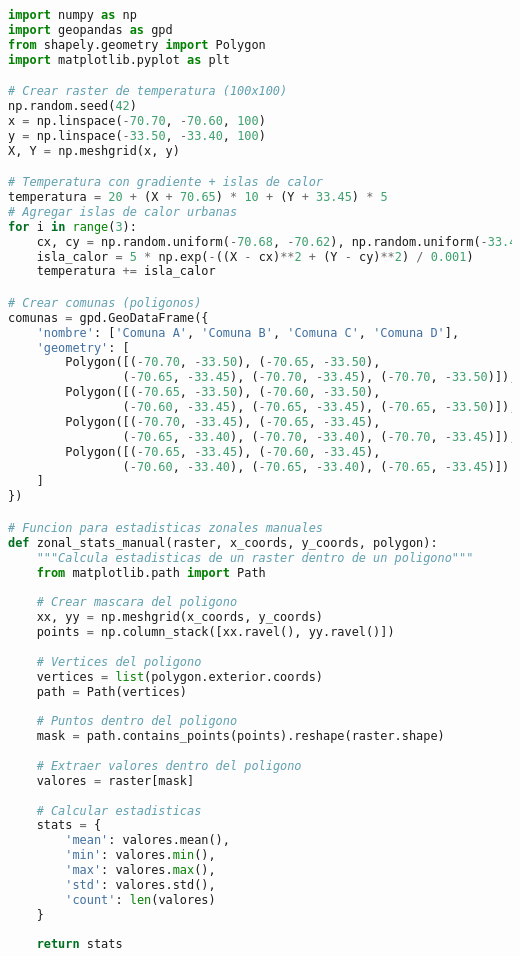 \documentclass[11pt,a4paper]{article}
\begin{document}
\begin{lstlisting}[language=Python]
import numpy as np
import geopandas as gpd
from shapely.geometry import Polygon
import matplotlib.pyplot as plt

# Crear raster de temperatura (100x100)
np.random.seed(42)
x = np.linspace(-70.70, -70.60, 100)
y = np.linspace(-33.50, -33.40, 100)
X, Y = np.meshgrid(x, y)

# Temperatura con gradiente + islas de calor
temperatura = 20 + (X + 70.65) * 10 + (Y + 33.45) * 5
# Agregar islas de calor urbanas
for i in range(3):
    cx, cy = np.random.uniform(-70.68, -70.62), np.random.uniform(-33.48, -33.42)
    isla_calor = 5 * np.exp(-((X - cx)**2 + (Y - cy)**2) / 0.001)
    temperatura += isla_calor

# Crear comunas (poligonos)
comunas = gpd.GeoDataFrame({
    'nombre': ['Comuna A', 'Comuna B', 'Comuna C', 'Comuna D'],
    'geometry': [
        Polygon([(-70.70, -33.50), (-70.65, -33.50), 
                (-70.65, -33.45), (-70.70, -33.45), (-70.70, -33.50)]),
        Polygon([(-70.65, -33.50), (-70.60, -33.50), 
                (-70.60, -33.45), (-70.65, -33.45), (-70.65, -33.50)]),
        Polygon([(-70.70, -33.45), (-70.65, -33.45), 
                (-70.65, -33.40), (-70.70, -33.40), (-70.70, -33.45)]),
        Polygon([(-70.65, -33.45), (-70.60, -33.45), 
                (-70.60, -33.40), (-70.65, -33.40), (-70.65, -33.45)])
    ]
})

# Funcion para estadisticas zonales manuales
def zonal_stats_manual(raster, x_coords, y_coords, polygon):
    """Calcula estadisticas de un raster dentro de un poligono"""
    from matplotlib.path import Path
    
    # Crear mascara del poligono
    xx, yy = np.meshgrid(x_coords, y_coords)
    points = np.column_stack([xx.ravel(), yy.ravel()])
    
    # Vertices del poligono
    vertices = list(polygon.exterior.coords)
    path = Path(vertices)
    
    # Puntos dentro del poligono
    mask = path.contains_points(points).reshape(raster.shape)
    
    # Extraer valores dentro del poligono
    valores = raster[mask]
    
    # Calcular estadisticas
    stats = {
        'mean': valores.mean(),
        'min': valores.min(),
        'max': valores.max(),
        'std': valores.std(),
        'count': len(valores)
    }
    
    return stats


\end{lstlisting}
\end{document}

